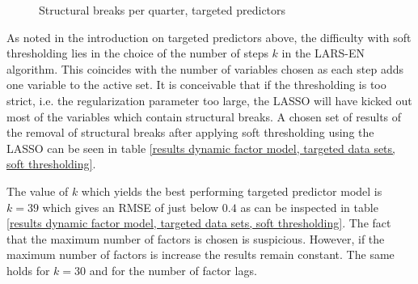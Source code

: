 \documentclass[12pt]{article}
\begin{document}
\begin{figure}[htp]
\centering
{}
\caption{Structural breaks per quarter, targeted predictors}
\label{structural breaks per period, targeted predictors}
\end{figure}



\clearpage

As noted in the introduction on targeted predictors above, the difficulty with soft thresholding lies in the choice of the number of steps $k$ in the LARS-EN algorithm. This coincides with the number of variables chosen as each step adds one variable to the active set. It is conceivable that if the thresholding is too strict, i.e. the regularization parameter too large, the LASSO will have kicked out most of the variables which contain structural breaks. A chosen set of results of the removal of structural breaks after applying soft thresholding using the LASSO can be seen in table \ref{results dynamic factor model, targeted data sets, soft thresholding}. 

The value of $k$ which yields the best performing targeted predictor model is $k=39$ which gives an RMSE of just below $0.4$ as can be inspected in table \ref{results dynamic factor model, targeted data sets, soft thresholding}. The fact that the maximum number of factors is chosen is suspicious. However, if the maximum number of factors is increase the results remain constant. The same holds for $k=30$ and for the number of factor lags. \\
\end{document}
